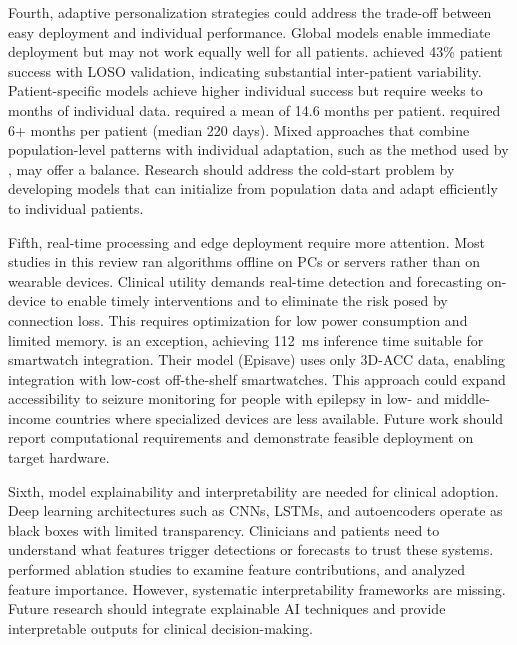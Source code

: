 Fourth, adaptive personalization strategies could address the trade-off between easy deployment and individual performance. Global models enable immediate deployment but may not work equally well for all patients. \textcite{meiselMachineLearningWristband2020} achieved 43\% patient success with LOSO validation, indicating substantial inter-patient variability. Patient-specific models achieve higher individual success but require weeks to months of individual data. \textcite{stirlingForecastingSeizureLikelihood2021} required a mean of 14.6 months per patient. \textcite{nasseriAmbulatorySeizureForecasting2021} required 6+ months per patient (median 220 days). Mixed approaches that combine population-level patterns with individual adaptation, such as the method used by \textcite{vielufSeizureMonitoringCombined2025}, may offer a balance. Research should address the cold-start problem by developing models that can initialize from population data and adapt efficiently to individual patients.

Fifth, real-time processing and edge deployment require more attention. Most studies in this review ran algorithms offline on PCs or servers rather than on wearable devices. Clinical utility demands real-time detection and forecasting on-device to enable timely interventions and to eliminate the risk posed by connection loss. This requires optimization for low power consumption and limited memory. \textcite{spahrDeepLearningbasedDetection2025} is an exception, achieving 112~ms inference time suitable for smartwatch integration. Their model (Episave) uses only 3D-ACC data, enabling integration with low-cost off-the-shelf smartwatches. This approach could expand accessibility to seizure monitoring for people with epilepsy in low- and middle-income countries where specialized devices are less available. Future work should report computational requirements and demonstrate feasible deployment on target hardware.

Sixth, model explainability and interpretability are needed for clinical adoption. Deep learning architectures such as CNNs, LSTMs, and autoencoders operate as black boxes with limited transparency. Clinicians and patients need to understand what features trigger detections or forecasts to trust these systems. \textcite{nasseriAmbulatorySeizureForecasting2021} performed ablation studies to examine feature contributions, and \textcite{reintjesECGBasedDetectionEpileptic2025} analyzed feature importance. However, systematic interpretability frameworks are missing. Future research should integrate explainable AI techniques and provide interpretable outputs for clinical decision-making.

